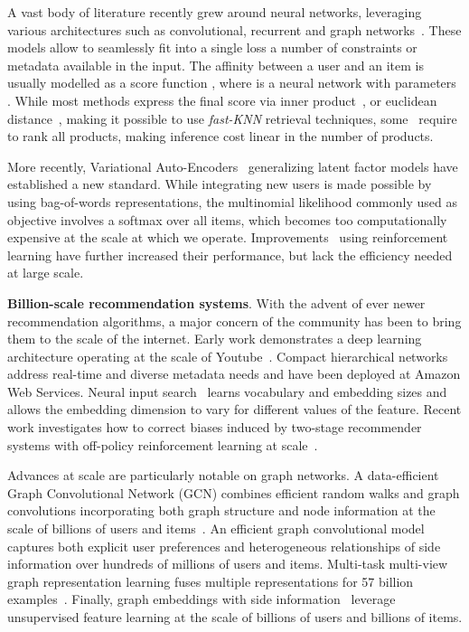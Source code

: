 \documentclass[sigconf]{acmart}
\begin{document}
A vast body of literature recently grew around neural networks, leveraging various architectures such as convolutional, recurrent and graph networks~\cite{deep-learning-karatzoglou-2017, deep-music-recommendation-nips, deep-survey, graph-networks-pinterest-kdd-2018, alibaba-intentgc-kdd-2019, alibaba-m2glr-kdd-2020, pixie-pinterest-www-2018, alibaba-ctr}. These models allow to seamlessly fit into a single loss a number of constraints or metadata available in the input. The affinity between a user  and an item  is usually modelled as a score function , where  is a neural network with parameters . While most methods express the final score via inner product~\cite{lightrec-www-2020,gramian}, or euclidean distance~\cite{cml-www}, making it possible to use \emph{fast-KNN} retrieval techniques, some~\cite{ncf-www-2017} require to rank all products, making inference cost linear in the number of products. 

More recently, Variational Auto-Encoders~\cite{variational-liang-2018,rec-vae,gated-vaes} generalizing latent factor models have established a new standard. While integrating new users is made possible by using bag-of-words representations, the multinomial likelihood commonly used as objective involves a softmax over all items, which becomes too computationally expensive at the scale at which we operate. Improvements~\cite{ract-cf} using reinforcement learning have further increased their performance, but lack the efficiency needed at large scale.

\textbf{Billion-scale recommendation systems}. With the advent of ever newer recommendation algorithms, a major concern of the community has been to bring them to the scale of the internet. Early work demonstrates a deep learning architecture operating at the scale of Youtube~\cite{deep-youtube}. Compact hierarchical networks~\cite{aws-hrnn-kdd-2020} address real-time and diverse metadata needs and have been deployed at Amazon Web Services. Neural input search~\cite{google-neural-search-kdd-2020} learns vocabulary and embedding sizes and allows the embedding dimension to vary for different values of the feature. Recent work investigates how
to correct biases induced by two-stage recommender systems with off-policy reinforcement learning at scale~\cite{off-policy-reco-www-2020}.  





Advances at scale are particularly notable on graph networks. A data-efficient Graph Convolutional Network (GCN) combines efficient random walks and graph convolutions incorporating both graph structure and node information at the scale of billions of users and items~\cite{graph-networks-pinterest-kdd-2018}. An efficient graph convolutional model~\cite{alibaba-intentgc-kdd-2019} captures both explicit user preferences and heterogeneous relationships of side information over hundreds of millions of users and items. Multi-task multi-view graph representation learning fuses multiple representations for 57 billion examples~\cite{alibaba-m2glr-kdd-2020}.  Finally, graph embeddings with side information~\cite{alibaba-graphs-kdd-2018} leverage unsupervised feature learning at the scale of billions of users and billions of items. 
\end{document}
